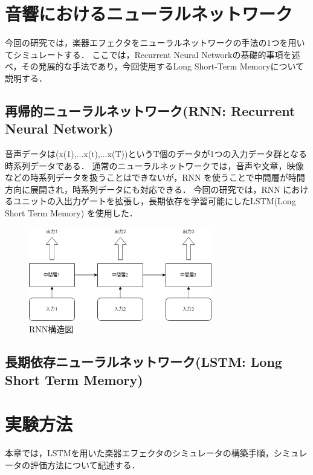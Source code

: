 \documentclass{jreport}		%
\begin{document}
\chapter{音響におけるニューラルネットワーク}
今回の研究では，楽器エフェクタをニューラルネットワークの手法の1つを用いてシミュレートする．
ここでは，Recurrent Neural Networkの基礎的事項を述べ，その発展的な手法であり，今回使用するLong Short-Term Memoryについて説明する．

\section{再帰的ニューラルネットワーク(RNN: Recurrent Neural Network)}
音声データは(x(1),...x(t),...x(T))というT個のデータが1つの入力データ群となる時系列データである．
通常のニューラルネットワークでは，音声や文章，映像などの時系列データを扱うことはできないが，RNN を使うことで中間層が時間方向に展開され，時系列データにも対応できる．
今回の研究では，RNN におけるユニットの入出力ゲートを拡張し，長期依存を学習可能にしたLSTM(Long Short Term Memory) を使用した．

\begin{figure}[htbp]
 \begin{center}
  \includegraphics[width=80mm]{RNN.png}
 \end{center}
 \caption{RNN構造図}
 \label{fig:one}
\end{figure}

\section{長期依存ニューラルネットワーク(LSTM: Long Short Term Memory)}

\chapter{実験方法}
本章では，LSTMを用いた楽器エフェクタのシミュレータの構築手順，シミュレータの評価方法について記述する．
\end{document}
